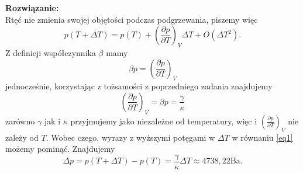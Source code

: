 \documentclass[11pt,a4paper]{article}
\newcommand{\Partial}[3]{\left( \frac{\partial #1}{\partial #2} \right)_{#3}}
\begin{document}
\textbf{Rozwiązanie:}
\\
Rtęć nie zmienia swojej objętości podczas podgrzewania, piszemy więc
\begin{equation}
\label{eq1}
    p(T+\Delta T)=p(T)+ \Partial{p}{T}{V} \Delta T +O(\Delta T^2).
\end{equation}
Z definicji współczynnika $\beta$ mamy
\begin{equation*}
    \beta p =\Partial{p}{T}{V}
\end{equation*}
jednocześnie, korzystając z tożsamości z poprzedniego zadania znajdujemy
\begin{equation*}
    \Partial{p}{T}{V} = \beta p =\frac{\gamma}{\kappa}
\end{equation*}
zarówno $\gamma$ jak i $\kappa$ przyjmujemy jako niezależne od temperatury, więc i $\Partial{p}{T}{V}$ nie zależy od $T$. Wobec czego, wyrazy z wyższymi potęgami w $\Delta T$ w równaniu \eqref{eq1} możemy pominąć.
Znajdujemy
\begin{equation*}
    \Delta p = p(T+\Delta T)-p(T)=\frac{\gamma}{\kappa} \Delta T \approx 4738,22 \text{Ba}.
\end{equation*}
\newpage
\end{document}
